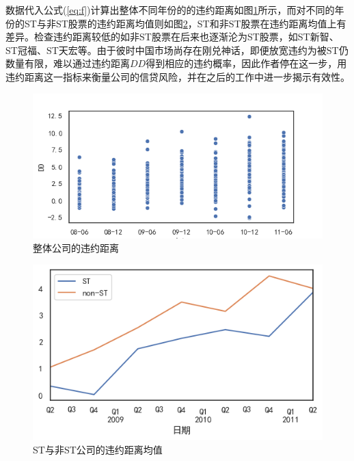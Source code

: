\documentclass[a4paper,12pt]{ctexart}
\begin{document}
数据代入公式(\ref{eq:f})计算出整体不同年份的的违约距离如图\ref{fig:dd}所示，而对不同的年份的ST与非ST股票的违约距离均值则如图\ref{fig:st}，ST和非ST股票在违约距离均值上有差异。检查违约距离较低的如非ST股票在后来也逐渐沦为ST股票，如ST新智、ST冠福、ST天宏等。由于彼时中国市场尚存在刚兑神话，即便放宽违约为被ST仍数量有限，难以通过违约距离$DD$得到相应的违约概率，因此作者停在这一步，用违约距离这一指标来衡量公司的信贷风险，并在之后的工作\cite{彭伟2012我国上市中小企业信贷风险研究}中进一步揭示有效性。
\begin{figure}[H]
    \includegraphics[width=\linewidth]{img/dd.png}
    \caption{整体公司的违约距离}\label{fig:dd}
\end{figure}
\begin{figure}[H]
    \includegraphics[width=\linewidth]{img/st-vs-non-st.png}
    \caption{ST与非ST公司的违约距离均值}\label{fig:st}
\end{figure}
\end{document}
